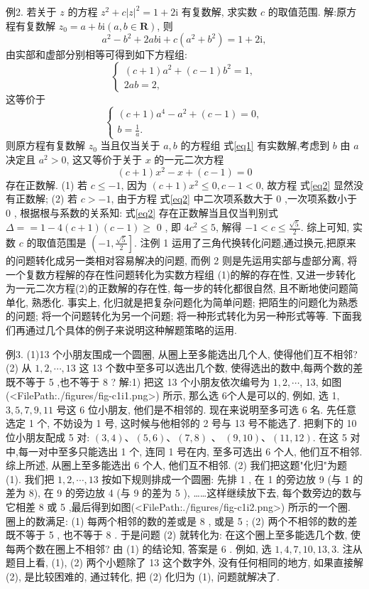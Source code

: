 例2. 若关于 $z$ 的方程 $z^2+c|z|^2=1+2 \mathrm{i}$ 有复数解, 求实数 $c$ 的取值范围.
解:原方程有复数解 $z_0=a+b \mathrm{i}(a, b \in \mathbf{R})$, 则
$$
a^2-b^2+2 a b \mathrm{i}+c\left(a^2+b^2\right)=1+2 \mathrm{i},
$$
由实部和虚部分别相等可得到如下方程组:
$$
\left\{\begin{array}{l}
(c+1) a^2+(c-1) b^2=1, \\
2 a b=2,
\end{array}\right.
$$
这等价于
$$
\left\{\begin{array}{l}
(c+1) a^4-a^2+(c-1)=0, \\
b=\frac{1}{a} .
\end{array}\right. \label{eq1}
$$
则原方程有复数解 $z_0$ 当且仅当关于 $a, b$ 的方程组 式\ref{eq1} 有实数解,考虑到 $b$ 由 $a$ 决定且 $a^2>0$, 这又等价于关于 $x$ 的一元二次方程
$$
(c+1) x^2-x+(c-1)=0 \label{eq2}
$$
存在正数解.
(1) 若 $c \leqslant-1$, 因为 $(c+1) x^2 \leqslant 0, c-1<0$, 故方程 式\ref{eq2} 显然没有正数解;
(2) 若 $c>-1$, 由于方程 式\ref{eq2}  中二次项系数大于 0 ,一次项系数小于 0 , 根据根与系数的关系知: 式\ref{eq2} 存在正数解当且仅当判别式 $\Delta==1-4(c+1)(c-1) \geqslant$ 0 , 即 $4 c^2 \leqslant 5$, 解得 $-1<c \leqslant \frac{\sqrt{5}}{2}$.
综上可知, 实数 $c$ 的取值范围是 $\left(-1, \frac{\sqrt{5}}{2}\right]$.
注例 1 运用了三角代换转化问题,通过换元,把原来的问题转化成另一类相对容易解决的问题, 而例 2 则是先运用实部与虚部分离, 将一个复数方程解的存在性问题转化为实数方程组 (1)的解的存在性, 又进一步转化为一元二次方程(2)的正数解的存在性, 每一步的转化都很自然, 且不断地使问题简单化, 熟悉化.
事实上, 化归就是把复杂问题化为简单问题; 把陌生的问题化为熟悉的问题; 将一个问题转化为另一个问题; 将一种形式转化为另一种形式等等.
下面我们再通过几个具体的例子来说明这种解题策略的运用.



例3. (1)13 个小朋友围成一个圆圈, 从圈上至多能选出几个人, 使得他们互不相邻?
(2) 从 $1,2, \cdots, 13$ 这 13 个数中至多可以选出几个数, 使得选出的数中,每两个数的差既不等于 5 ,也不等于 8 ?
解:1) 把这 13 个小朋友依次编号为 $1,2, \cdots$, 13, 如图(<FilePath:./figures/fig-c1i1.png>) 所示, 那么选 6个人是可以的, 例如, 选 1, $3,5,7,9,11$ 号这 6 位小朋友, 他们是不相邻的.
现在来说明至多可选 6 名.
先任意选定 1 个, 不妨设为 1 号, 这时候与他相邻的 2 号与 13 号不能选了.
把剩下的 10 位小朋友配成 5 对: $(3,4) 、(5,6) 、(7,8)$ 、 $(9,10) 、(11,12)$. 在这 5 对中,每一对中至多只能选出 1 个, 连同 1 号在内, 至多可选出 6 个人, 他们互不相邻.
综上所述, 从圈上至多能选出 6 个人, 他们互不相邻.
(2) 我们把这题"化归"为题 (1).
我们把 $1,2, \cdots, 13$ 按如下规则排成一个圆圈: 先排 1 , 在 1 的旁边放 9 (与 1 的差为 8), 在 9 的旁边放 4 (与 9 的差为 5 ), ……这样继续放下去, 每个数旁边的数与它相差 8 或 5 ,最后得到如图(<FilePath:./figures/fig-c1i2.png>) 所示的一个圈.
圈上的数满足:
(1) 每两个相邻的数的差或是 8 , 或是 5 ;
(2) 两个不相邻的数的差既不等于 5 , 也不等于 8 .
于是问题 (2) 就转化为: 在这个圈上至多能选几个数, 使每两个数在圈上不相邻? 由 (1) 的结论知, 答案是 6 . 例如, 选 $1,4,7,10,13,3$.
注从题目上看, (1), (2) 两个小题除了 13 这个数字外, 没有任何相同的地方, 如果直接解 (2), 是比较困难的, 通过转化, 把 (2) 化归为 (1), 问题就解决了.



